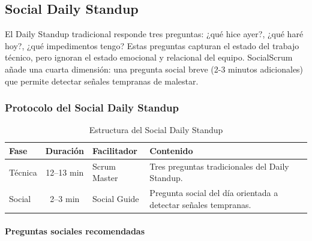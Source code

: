 \subsection{Social Daily Standup}

El Daily Standup tradicional responde tres preguntas: ¿qué hice ayer?, ¿qué haré hoy?, ¿qué impedimentos tengo? Estas preguntas capturan el estado del trabajo técnico, pero ignoran el estado emocional y relacional del equipo. SocialScrum añade una cuarta dimensión: una pregunta social breve (2-3 minutos adicionales) que permite detectar señales tempranas de malestar.

\subsubsection{Protocolo del Social Daily Standup}

\begin{table}[h]
    \centering
    \small
    \begin{tabularx}{\textwidth}{|l|c|l|X|}
        \hline
        \textbf{Fase} & \textbf{Duración}                                               & \textbf{Facilitador} & \textbf{Contenido} \\
        \hline
        Técnica
                      & 12--13 min
                      & Scrum Master
                      & Tres preguntas tradicionales del Daily Standup.                                                             \\
        \hline
        Social
                      & 2--3 min
                      & Social Guide
                      & Pregunta social del día orientada a detectar señales tempranas.                                             \\
        \hline
    \end{tabularx}
    \caption{Estructura del Social Daily Standup}
    \label{tab:daily-social-estructura}
\end{table}

\FloatBarrier

\paragraph{Preguntas sociales recomendadas}

